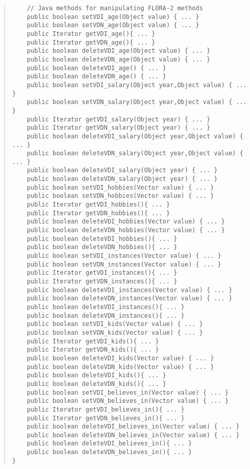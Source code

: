 \begin{quote}
\begin{verbatim}
    // Java methods for manipulating FLORA-2 methods
    public boolean setVDI_age(Object value) { ... }
    public boolean setVDN_age(Object value) { ... }
    public Iterator getVDI_age(){ ... }
    public Iterator getVDN_age(){ ... }
    public boolean deleteVDI_age(Object value) { ... }
    public boolean deleteVDN_age(Object value) { ... }
    public boolean deleteVDI_age() { ... }
    public boolean deleteVDN_age() { ... }
    public boolean setVDI_salary(Object year,Object value) { ... }
    public boolean setVDN_salary(Object year,Object value) { ... }
    public Iterator getVDI_salary(Object year) { ... }
    public Iterator getVDN_salary(Object year) { ... }
    public boolean deleteVDI_salary(Object year,Object value) { ... }
    public boolean deleteVDN_salary(Object year,Object value) { ... }
    public boolean deleteVDI_salary(Object year) { ... }
    public boolean deleteVDN_salary(Object year) { ... }
    public boolean setVDI_hobbies(Vector value) { ... }
    public boolean setVDN_hobbies(Vector value) { ... }
    public Iterator getVDI_hobbies(){ ... }
    public Iterator getVDN_hobbies(){ ... }
    public boolean deleteVDI_hobbies(Vector value) { ... }
    public boolean deleteVDN_hobbies(Vector value) { ... }
    public boolean deleteVDI_hobbies(){ ... }
    public boolean deleteVDN_hobbies(){ ... }
    public boolean setVDI_instances(Vector value) { ... }
    public boolean setVDN_instances(Vector value) { ... }
    public Iterator getVDI_instances(){ ... }
    public Iterator getVDN_instances(){ ... }
    public boolean deleteVDI_instances(Vector value) { ... }
    public boolean deleteVDN_instances(Vector value) { ... }
    public boolean deleteVDI_instances(){ ... }
    public boolean deleteVDN_instances(){ ... }
    public boolean setVDI_kids(Vector value) { ... }
    public boolean setVDN_kids(Vector value) { ... }
    public Iterator getVDI_kids(){ ... }
    public Iterator getVDN_kids(){ ... }
    public boolean deleteVDI_kids(Vector value) { ... }
    public boolean deleteVDN_kids(Vector value) { ... }
    public boolean deleteVDI_kids(){ ... }
    public boolean deleteVDN_kids(){ ... }
    public boolean setVDI_believes_in(Vector value) { ... }
    public boolean setVDN_believes_in(Vector value) { ... }
    public Iterator getVDI_believes_in(){ ... }
    public Iterator getVDN_believes_in(){ ... }
    public boolean deleteVDI_believes_in(Vector value) { ... }
    public boolean deleteVDN_believes_in(Vector value) { ... }
    public boolean deleteVDI_believes_in(){ ... }
    public boolean deleteVDN_believes_in(){ ... }
}
\end{verbatim}
\end{quote}

